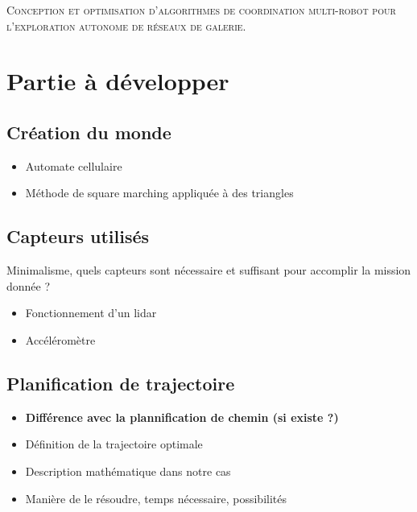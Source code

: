 \documentclass{article}
\numberwithin{figure}{section}
\numberwithin{table}{section}
\begin{document}
\begin{titlepage}
    \begin{center}
        \Large
        \vfill
        \textsc{Conception et optimisation d'algorithmes de coordination multi-robot pour l'exploration autonome de réseaux de galerie.}
        \vfill
    \end{center}
\end{titlepage}
\newpage



\newpage



\newpage



\newpage

\section{Partie à développer}

\subsection*{Création du monde}
\begin{itemize}
    \item Automate cellulaire
    \item Méthode de square marching appliquée à des triangles
\end{itemize}

\subsection*{Capteurs utilisés}
Minimalisme, quels capteurs sont nécessaire et suffisant pour accomplir la mission donnée ?
\begin{itemize}
    \item Fonctionnement d'un lidar
    \item Accéléromètre
\end{itemize}

\subsection*{Planification de trajectoire}
\begin{itemize}
	\item \textbf{Différence avec la plannification de chemin (si existe ?)}
    \item Définition de la trajectoire optimale
    \item Description mathématique dans notre cas
    \item Manière de le résoudre, temps nécessaire, possibilités
\end{itemize}
\end{document}
